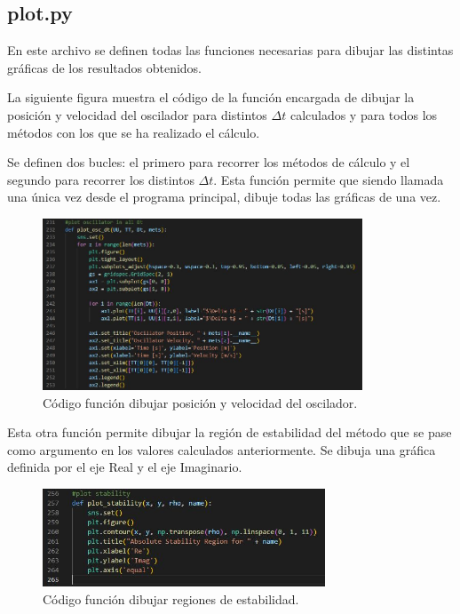 \documentclass[12pt,a4paper]{article}
\begin{document}
\subsection{plot.py}
En este archivo se definen todas las funciones necesarias para dibujar las distintas gráficas de los resultados obtenidos.

La siguiente figura muestra el código de la función encargada de dibujar la posición y velocidad del oscilador para distintos $\Delta t$ calculados y para todos los métodos con los que se ha realizado el cálculo.

Se definen dos bucles: el primero para recorrer los métodos de cálculo y el segundo para recorrer los distintos $\Delta t$. Esta función permite que siendo llamada una única vez desde el programa principal, dibuje todas las gráficas de una vez.
\begin{figure}[H]
	\centering
	\includegraphics[width=0.85\textwidth]{FIGURES/mil4/codigo/plot1.JPG}
	\caption{Código función dibujar posición y velocidad del oscilador.}
	\label{plot1}
\end{figure}

Esta otra función permite dibujar la región de estabilidad del método que se pase como argumento en los valores calculados anteriormente. Se dibuja una gráfica definida por el eje Real y el eje Imaginario.
\begin{figure}[H]
	\centering
	\includegraphics[width=0.75\textwidth]{FIGURES/mil4/codigo/plot2.JPG}
	\caption{Código función dibujar regiones de estabilidad.}
	\label{plot2}
\end{figure}
\end{document}
